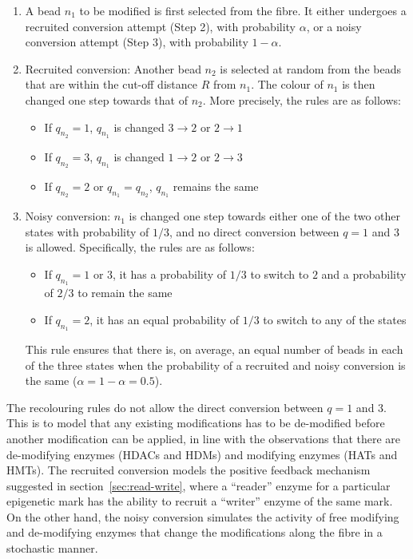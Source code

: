 \documentclass[12pt]{article}
\begin{document}
\begin{enumerate}
\item A bead $n_1$ to be modified is first selected from the fibre. It either undergoes a recruited conversion attempt (Step 2), with probability $\alpha$, or a noisy conversion attempt (Step 3), with probability $1 - \alpha$.

\item Recruited conversion: Another bead  $n_2$ is selected at random from the beads that are within the cut-off distance $R$ from $n_1$. The colour of $n_1$ is then changed one step towards that of $n_2$. More precisely, the rules are as follows:
\begin{itemize}
\item If $q_{n_2} = 1$, $q_{n_1}$ is changed $3 \rightarrow 2$ or $2 \rightarrow 1$
\item If $q_{n_2} = 3$, $q_{n_1}$ is changed $1 \rightarrow 2$ or $2 \rightarrow 3$
\item If $q_{n_2} = 2$ or $q_{n_1} = q_{n_2}$, $q_{n_1}$ remains the same
\end{itemize}

\item Noisy conversion:  $n_1$ is changed one step towards either one of the two other states with probability of $1/3$, and no direct conversion between $q  = 1$ and 3 is allowed. Specifically, the rules are as follows:
\begin{itemize}
\item If $q_{n_1} = 1$ or $3$, it has a probability of $1/3$ to switch to $2$ and a probability of $2/3$ to remain the same
\item If $q_{n_1} = 2$, it has an equal probability of $1/3$ to switch to any of the states
\end{itemize}
This rule ensures that there is, on average, an equal number of beads in each of the three states when the probability of a recruited and noisy conversion is the same ($\alpha = 1 - \alpha = 0.5$).
\end{enumerate}

The recolouring rules do not allow the direct conversion between $q = 1$ and 3. This is to model that any existing modifications has to be de-modified before another modification can be applied, in line with the observations that there are de-modifying enzymes (HDACs and HDMs) and modifying enzymes (HATs and HMTs). The recruited conversion models the positive feedback mechanism suggested in section~\ref{sec:read-write}, where a ``reader'' enzyme for a particular epigenetic mark has the ability to recruit a ``writer'' enzyme of the same mark. On the other hand, the noisy conversion simulates the activity of free modifying and de-modifying enzymes that change the modifications along the fibre in a stochastic manner.
\end{document}
